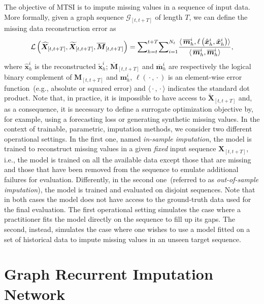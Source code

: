 \documentclass{article} \usepackage{iclr2022_conference,times}
\def\vm{{\bm{m}}}
\def\vx{{\bm{x}}}
\def\mM{{\bm{M}}}
\def\mX{{\bm{X}}}
\def\gG{{\mathcal{G}}}
\newcommand{\Ls}{\mathcal{L}}
\begin{document}
The objective of MTSI is to impute missing values in a sequence of input data. More formally, given a graph sequence $\gG_{[t, t+T]}$ of length $T$, we can define the missing data reconstruction error as
\begin{equation}
    \label{eq:loss}
    \Ls\left(\widehat \mX_{[t, t+T]}, \widetilde \mX_{[t, t+T]}, \overline \mM_{[t, t+T]}\right) = \footnotesize{\sum}_{h=t}^{t+T}\footnotesize{\sum}_{i=1}^{N_t}\frac{\langle\,\overline \vm^i_h, \ell\left(\hat \vx_h^i, \tilde \vx_h^i\right)\rangle}{\langle\,\overline \vm^i_h, \overline \vm^i_h\rangle},
\end{equation}
where $\hat \vx_h^i$ is the reconstructed $\tilde \vx_h^i$; $\overline \mM_{[t, t+T]}$ and $\overline \vm^i_h$ are respectively the logical binary complement of $\mM_{[t, t+T]}$ and $\vm^i_h$, $\ell({}\cdot{},{}\cdot{})$ is an element-wise error function~(e.g., absolute or squared error) and $\langle {}\cdot{},{}\cdot{}\rangle$ indicates the standard dot product. Note that, in practice, it is impossible to have access to $\widetilde \mX_{[t, t+T]}$ and, as a consequence, it is necessary to define a surrogate optimization objective by, for example, using a forecasting loss or generating synthetic missing values. In the context of trainable, parametric, imputation methods, we consider two different operational settings. In the first one, named \emph{in-sample imputation}, the model is trained to reconstruct missing values in a given \emph{fixed} input sequence $\mX_{[t,t+T]}$, i.e., the model is trained on all the available data except those that are missing and those that have been removed from the sequence to emulate additional failures for evaluation. Differently, in the second one~(referred to as \emph{out-of-sample imputation}), the model is trained and evaluated on disjoint sequences. Note that in both cases the model does not have access to the ground-truth data used for the final evaluation. The first operational setting simulates the case where a practitioner fits the model directly on the sequence to fill up its gaps. The second, instead, simulates the case where one wishes to use a model fitted on a set of historical data to impute missing values in an unseen target sequence. 

\section{Graph Recurrent Imputation Network}\label{s:proposal}
\end{document}
